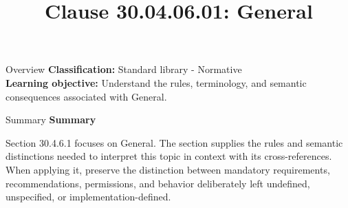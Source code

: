 \documentclass[10pt,letterpaper]{article}
\title{Clause 30.04.06.01: General}
\author{}
\date{}
\begin{document}
\maketitle
\begin{CornellOverviewBox}{Overview}
\textbf{Classification:} Standard library - Normative\\[2pt]
\textbf{Learning objective:} Understand the rules, terminology, and semantic consequences associated with General.
\end{CornellOverviewBox}\begin{CornellSummaryBox}{Summary}
{\sffamily\bfseries\color{Accent} Summary}\par\vspace{3pt}Section 30.4.6.1 focuses on General. The section supplies the rules and semantic distinctions needed to interpret this topic in context with its cross-references. When applying it, preserve the distinction between mandatory requirements, recommendations, permissions, and behavior deliberately left undefined, unspecified, or implementation-defined.
\end{CornellSummaryBox}
\end{document}
